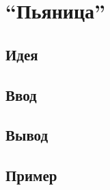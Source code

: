 \documentclass[12pt, oneside]{article}
\begin{document}
\begin{tabular}{| p{} |}
\hline
\\
\hline
\end{tabular}

\section{``Пьяница''}

\subsection*{Идея}

\subsection*{Ввод}

\subsection*{Вывод}

\subsection*{Пример}

\begin{tabular}{| p{} |}
\hline
\\
\hline
\end{tabular}
\end{document}
